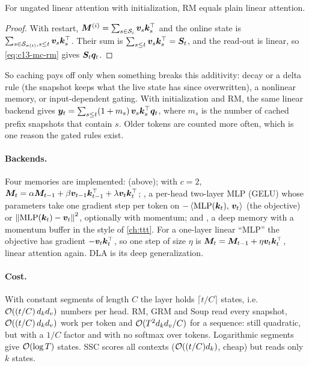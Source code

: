 \begin{proposition}\label{prop:c13-rm-restart}
For ungated linear attention with  initialization, RM equals plain linear attention.
\end{proposition}
\begin{proof}
With restart, $\bm{M}^{(i)}=\sum_{s\in\mathcal{S}_i}\bm{v}_s\bm{k}_s^{\top}$ and the online state is
$\sum_{s\in\mathcal{S}_{\sigma(t)},s\le t}\bm{v}_s\bm{k}_s^{\top}$. Their sum is $\sum_{s\le t}\bm{v}_s\bm{k}_s^{\top}=\bm{S}_t$, and the
read-out is linear, so \eqref{eq:c13-mc-rm} gives $\bm{S}_t\bm{q}_t$.
\end{proof}
So caching pays off only when something breaks this additivity: decay or a delta rule (the snapshot
keeps what the live state has since overwritten), a nonlinear memory, or input-dependent gating. With
 initialization and RM, the same linear backend gives
$\bm{y}_t=\sum_{s\le t}(1+m_s)\,\bm{v}_s\bm{k}_s^{\top}\bm{q}_t$, where $m_s$ is the number of cached prefix snapshots
that contain $s$. Older tokens are counted more often, which is one reason the gated rules exist.

\paragraph{Backends.} Four memories are implemented:  (above);  with $c=2$,
$\bm{M}_t=\alpha\bm{M}_{t-1}+\beta\bm{v}_{t-1}\bm{k}_{t-1}^{\top}+\lambda\bm{v}_t\bm{k}_t^{\top}$; , a per-head two-layer
MLP (GELU) whose parameters take one gradient step per token on $-\left\langle \mathrm{MLP}(\bm{k}_t),\, \bm{v}_t\right\rangle$
(the  objective) or $\left\lVert \mathrm{MLP}(\bm{k}_t)-\bm{v}_t\right\rVert^2$, optionally with momentum; and
, a deep memory with a momentum buffer in the style of \cref{ch:ttt}. For a one-layer
linear ``MLP'' the  objective has gradient $-\bm{v}_t\bm{k}_t^{\top}$, so one step of size $\eta$ is
$\bm{M}_t=\bm{M}_{t-1}+\eta\bm{v}_t\bm{k}_t^{\top}$, linear attention again. DLA is its deep generalization.

\paragraph{Cost.} With constant segments of length $C$ the layer holds $\lceil t/C\rceil$ states,
i.e.\ $\mathcal{O}((t/C)\,d_kd_v)$ numbers per head. RM, GRM and Soup read every snapshot, $\mathcal{O}((t/C)\,d_kd_v)$
work per token and $\mathcal{O}(T^2d_kd_v/C)$ for a sequence: still quadratic, but with a $1/C$ factor and with no
softmax over tokens. Logarithmic segments give $\mathcal{O}(\log T)$ states. SSC scores all contexts
($\mathcal{O}((t/C)d_k)$, cheap) but reads only $k$ states.

